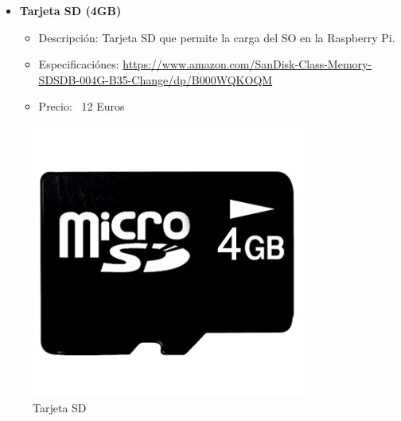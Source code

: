 {\begin{itemize}
 \item \textbf{Tarjeta SD (4GB)}
 \begin{itemize}
  \item Descripción: Tarjeta SD que permite la carga del SO en la Raspberry Pi.
  \item Especificaciónes: \url{https://www.amazon.com/SanDisk-Class-Memory-SDSDB-004G-B35-Change/dp/B000WQKOQM}
  \item Precio: ~12 Euros
 \end{itemize}
\end{itemize}
\begin{figure}[!ht]
  \begin{center}
    \includegraphics[scale=0.10]{../images/hardware/sd.jpg}
    \caption{Tarjeta SD}
    \label{fig:tarjetasd}
  \end{center}
\end{figure}


}
